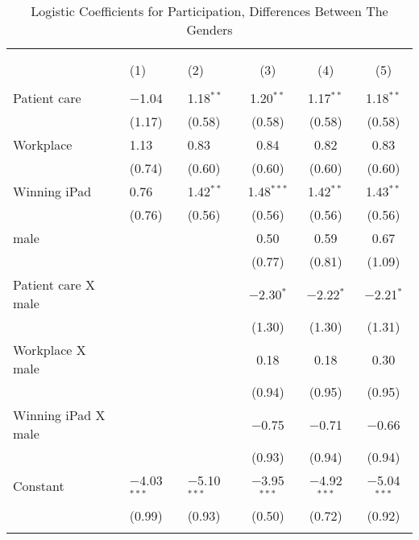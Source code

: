
\begin{table}[!htbp] \centering 
  \caption{Logistic Coefficients for Participation, Differences Between The Genders} 
  \label{tab:gender} 
{\tiny 
\begin{tabular}{@{\extracolsep{0cm}}lbbccc} 
\\[-1.8ex]\hline 
\hline \\[-1.8ex] 
\\[-1.8ex] & (1) & (2) & (3) & (4) & (5)\\ 
\hline \\[-1.8ex] 
 Patient care & $-$1.04 & 1.18$^{**}$ & 1.20$^{**}$ & 1.17$^{**}$ & 1.18$^{**}$ \\ 
  & (1.17) & (0.58) & (0.58) & (0.58) & (0.58) \\ 
  Workplace & 1.13 & 0.83 & 0.84 & 0.82 & 0.83 \\ 
  & (0.74) & (0.60) & (0.60) & (0.60) & (0.60) \\ 
  Winning iPad & 0.76 & 1.42$^{**}$ & 1.48$^{***}$ & 1.42$^{**}$ & 1.43$^{**}$ \\ 
  & (0.76) & (0.56) & (0.56) & (0.56) & (0.56) \\ 
  male &  &  & 0.50 & 0.59 & 0.67 \\ 
  &  &  & (0.77) & (0.81) & (1.09) \\ 
  Patient care X male &  &  & $-$2.30$^{*}$ & $-$2.22$^{*}$ & $-$2.21$^{*}$ \\ 
  &  &  & (1.30) & (1.30) & (1.31) \\ 
  Workplace X male &  &  & 0.18 & 0.18 & 0.30 \\ 
  &  &  & (0.94) & (0.95) & (0.95) \\ 
  Winning iPad X male &  &  & $-$0.75 & $-$0.71 & $-$0.66 \\ 
  &  &  & (0.93) & (0.94) & (0.94) \\ 
  Constant & $-$4.03$^{***}$ & $-$5.10$^{***}$ & $-$3.95$^{***}$ & $-$4.92$^{***}$ & $-$5.04$^{***}$ \\ 
  & (0.99) & (0.93) & (0.50) & (0.72) & (0.92) \\ 
 \hline \\[-1.8ex] 

\end{tabular}}
\end{table}
